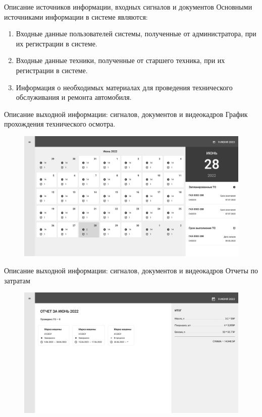 \documentclass{beamer}
\begin{document}
\begin{frame}
	{Описание источников информации, входных сигналов и документов}
    Основными источниками информации в системе являются:
    \begin{enumerate}
        \item Входные данные пользователей системы, полученные от администратора,
            при их регистрации в системе.
        \item Входные данные техники, полученные от старшего техника, при их
            регистрации в системе.
        \item Информация о необходимых материалах для проведения технического
            обслуживания и ремонта автомобиля.
    \end{enumerate}
\end{frame}

\begin{frame}
	{Описание выходной информации: сигналов, документов и видеокадров}
    График прохождения технического осмотра.
    \begin{figure}[H]
        \centering
        \includegraphics[keepaspectratio,width=\textwidth]{3/images/calendar-planning.png}
    \end{figure}
\end{frame}
\begin{frame}
	{Описание выходной информации: сигналов, документов и видеокадров}
    Отчеты по затратам
    \begin{figure}[H]
        \centering
        \includegraphics[keepaspectratio,width=\textwidth]{3/images/expenses-report.png}
    \end{figure}
\end{frame}
\end{document}
